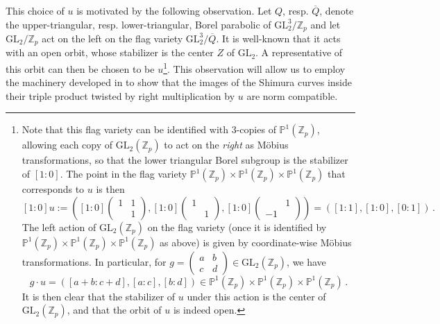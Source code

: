 \documentclass{amsart}
\numberwithin{equation}{section}
\newcommand{\Zp}{\mathbb{Z}_p}
\newcommand{\ZZ}{\mathbb{Z}}
\newcommand{\GL}{\mathrm{GL}}
\begin{document}
\subsubsection{}
    This choice of $u$ is motivated by the following observation. Let $Q$, resp. $\overline{Q}$, 
denote the upper-triangular, resp. lower-triangular, Borel parabolic of $\GL_2^3/\Zp$ and let $\GL_2/\Zp$ act on the left on the flag variety $\GL_2^3/\overline{Q}$. It is well-known that it acts with an open orbit, whose stabilizer is the center $Z$ of $\GL_2$. A representative of this orbit can then be chosen to be $u$\footnote{Note that this flag variety can be identified with $3$-copies of $\mathbb P^1(\ZZ_p)$, allowing each copy of ${\GL}_2(\ZZ_p)$ to act on the \emph{right} as M\"obius transformations, so that the lower triangular Borel subgroup is the stabilizer of $[1:0]$. The point in  the flag variety $\mathbb P^1(\ZZ_p)\times \mathbb P^1(\ZZ_p)\times \mathbb P^1(\ZZ_p)$ that corresponds to $u$ is then 
$$[1:0]u:=\left( [1: 0] \left(\begin{smallmatrix} 1 &  1 \\  & 1 \end{smallmatrix} \right), [1: 0]\left( \begin{smallmatrix} 1 &  \\  & 1 \end{smallmatrix} \right),[1: 0]\left( \begin{smallmatrix}  &  1 \\ -1 &  \end{smallmatrix} \right)\right)=\left([1:1], [1:0], [0:1]\right)\,.$$
The left action of $\GL_2(\ZZ_p)$ on the flag variety (once it is identified by $\mathbb P^1(\ZZ_p)\times \mathbb P^1(\ZZ_p)\times \mathbb P^1(\ZZ_p)$ as above) is given by coordinate-wise M\"obius transformations. In particular, for $g=\left(\begin{smallmatrix} a &  b \\ c & d \end{smallmatrix} \right)\in \GL_2(\ZZ_p)$, we have
$$g\cdot u=\left([a+b:c+d],[a:c], [b:d] \right)\in \mathbb P^1(\ZZ_p)\times \mathbb P^1(\ZZ_p)\times \mathbb P^1(\ZZ_p)\,.$$
It is then clear that the stabilizer of $u$ under this action is the center of $\GL_2(\ZZ_p)$, and that the orbit of $u$ is indeed open.}. This observation will allow us to employ the machinery developed in \cite{LoefflerSpherical} to show that the images of the Shimura curves inside their triple product twisted by right multiplication by $u$ are norm compatible.
\end{document}
